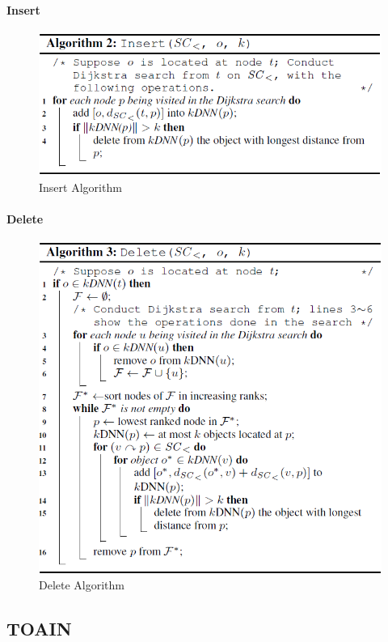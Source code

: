 \documentclass{ML}
\begin{document}
\paragraph{Insert}
\begin{figure}[htb]
	\centering
	\includegraphics[width=0.8\linewidth]{media/insert.png}
	\caption{Insert Algorithm}\label{fig:insert}
\end{figure}
\paragraph{Delete}
\begin{figure}[htb]
	\centering
	\includegraphics[width=0.8\linewidth]{media/delete.png}
	\caption{Delete Algorithm}\label{fig:delete}
\end{figure}
\subsection{TOAIN}
\end{document}
